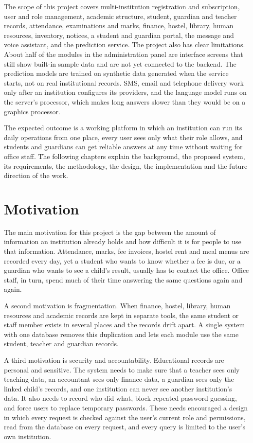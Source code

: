 The scope of this project covers multi-institution registration and subscription, user and role management, academic structure, student, guardian and teacher records, attendance, examinations and marks, finance, hostel, library, human resources, inventory, notices, a student and guardian portal, the message and voice assistant, and the prediction service. The project also has clear limitations. About half of the modules in the administration panel are interface screens that still show built-in sample data and are not yet connected to the backend. The prediction models are trained on synthetic data generated when the service starts, not on real institutional records. SMS, email and telephone delivery work only after an institution configures its providers, and the language model runs on the server's processor, which makes long answers slower than they would be on a graphics processor.

The expected outcome is a working platform in which an institution can run its daily operations from one place, every user sees only what their role allows, and students and guardians can get reliable answers at any time without waiting for office staff. The following chapters explain the background, the proposed system, its requirements, the methodology, the design, the implementation and the future direction of the work.

\section{Motivation}
The main motivation for this project is the gap between the amount of information an institution already holds and how difficult it is for people to use that information. Attendance, marks, fee invoices, hostel rent and meal menus are recorded every day, yet a student who wants to know whether a fee is due, or a guardian who wants to see a child's result, usually has to contact the office. Office staff, in turn, spend much of their time answering the same questions again and again.

A second motivation is fragmentation. When finance, hostel, library, human resources and academic records are kept in separate tools, the same student or staff member exists in several places and the records drift apart. A single system with one database removes this duplication and lets each module use the same student, teacher and guardian records.

A third motivation is security and accountability. Educational records are personal and sensitive. The system needs to make sure that a teacher sees only teaching data, an accountant sees only finance data, a guardian sees only the linked child's records, and one institution can never see another institution's data. It also needs to record who did what, block repeated password guessing, and force users to replace temporary passwords. These needs encouraged a design in which every request is checked against the user's current role and permissions, read from the database on every request, and every query is limited to the user's own institution.

